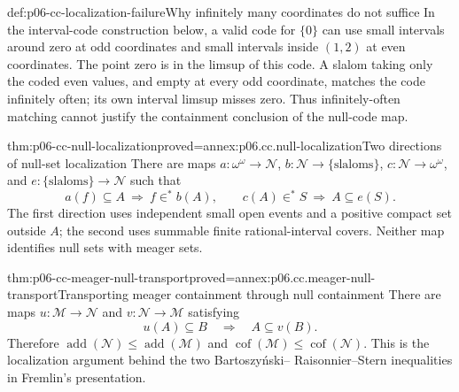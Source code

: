 \begin{hbexample}{def:p06-cc-localization-failure}{Why infinitely many coordinates do not suffice}
In the interval-code construction below, a valid code for \(\{0\}\)
can use small intervals around zero at odd coordinates and small
intervals inside \((1,2)\) at even coordinates. The point zero is in
the limsup of this code. A slalom taking only the coded even values,
and empty at every odd coordinate, matches the code infinitely often;
its own interval limsup misses zero. Thus infinitely-often matching
cannot justify the containment conclusion of the null-code map.
\end{hbexample}

\begin{hblemma}{thm:p06-cc-null-localization}{proved=annex:p06.cc.null-localization}{Two directions of null-set localization}
There are maps \(a:\omega^\omega\to\mathcal N\),
\(b:\mathcal N\to\{\text{slaloms}\}\),
\(c:\mathcal N\to\omega^\omega\), and
\(e:\{\text{slaloms}\}\to\mathcal N\) such that
\[
 a(f)\subseteq A\ \Longrightarrow\ f\in^*b(A),\qquad
 c(A)\in^*S\ \Longrightarrow\ A\subseteq e(S).
\]
The first direction uses independent small open events and a positive
compact set outside \(A\); the second uses summable finite rational-interval
covers. Neither map identifies null sets with meager sets.
\end{hblemma}

\begin{hbtheorem}{thm:p06-cc-meager-null-transport}{proved=annex:p06.cc.meager-null-transport}{Transporting meager containment through null containment}
There are maps \(u:\mathcal M\to
\mathcal N\) and
\(v:\mathcal N\to\mathcal M\) satisfying
\[
 u(A)\subseteq B\quad\Longrightarrow\quad A\subseteq v(B).
\]
Therefore
\(\operatorname{add}(\mathcal N)\leq
  \operatorname{add}(\mathcal M)\) and
\(\operatorname{cof}(\mathcal M)\leq
  \operatorname{cof}(\mathcal N)\).
This is the localization argument behind the two Bartoszy\'nski--
Raisonnier--Stern inequalities in Fremlin's presentation.
\end{hbtheorem}

